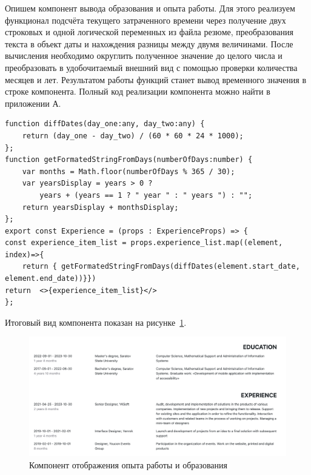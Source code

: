 \documentclass[master, och, diploma]{SCWorks}
\begin{document}
Опишем компонент вывода образования и опыта работы. Для этого реализуем функционал подсчёта текущего затраченного времени через получение двух строковых и одной логической переменных из файла резюме, преобразования текста в объект даты и нахождения разницы между двумя величинами. После вычисления необходимо округлить полученное значение до целого числа и преобразовать в удобочитаемый внешний вид с помощью проверки количества месяцев и лет. Результатом работы функций станет вывод временного значения в строке компонента. Полный код реализации компонента можно найти в приложении А.
\begin{verbatim}
function diffDates(day_one:any, day_two:any) {
    return (day_one - day_two) / (60 * 60 * 24 * 1000);
};
function getFormatedStringFromDays(numberOfDays:number) {
    var months = Math.floor(numberOfDays % 365 / 30);
    var yearsDisplay = years > 0 ? 
        years + (years == 1 ? " year " : " years ") : "";
    return yearsDisplay + monthsDisplay; 
};
export const Experience = (props : ExperienceProps) => {
const experience_item_list = props.experience_list.map((element, index)=>{
    return { getFormatedStringFromDays(diffDates(element.start_date, element.end_date))}})
return  <>{experience_item_list}</>
};
\end{verbatim}

Итоговый вид компонента показан на рисунке~\ref{fig:29}.  
\begin{figure}[!ht]
    \centering
    \includegraphics[width=12cm]{images/image-resume-2.png}
    \caption{\label{fig:29}%
        Компонент отображения опыта работы и образования}
\end{figure}
\end{document}
